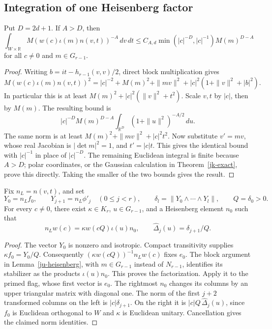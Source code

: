 \subsection{Integration of one Heisenberg factor}

\begin{lemma}\label{jm-e-int}
Put \(D=2d+1\).  If \(A>D\), then
\begin{equation}\label{jm-e-bound}
 \int_{W\times\mathbb R}
        M(w(c)\iota(m)n(v,t))^{-A}\,dv\,dt
 \leq C_{A,d}\min(|c|^{-D},|c|^{-1})M(m)^{D-A}
\end{equation}
for all \(c\ne0\) and \(m\in G_{r-1}\).
\end{lemma}

\begin{proof}
Writing \(b=it-h_{r-1}(v,v)/2\), direct block multiplication gives
\[
 M(w(c)\iota(m)n(v,t))^2
 =|c|^{-2}+M(m)^2+\|mv\|^2
                       +|c|^2(1+\|v\|^2+|b|^2).
\]
In particular this is at least
\(M(m)^2+|c|^2(\|v\|^2+t^2)\).
Scale \(v,t\) by \(|c|\), then by \(M(m)\).
The resulting bound is
\[
 |c|^{-D}M(m)^{D-A}
                    \int_{\mathbb R^D}(1+\|u\|^2)^{-A/2}\,du .
\]
The same norm is at least
\(M(m)^2+\|mv\|^2+|c|^2t^2\).
Now substitute \(v'=mv\), whose real Jacobian is
\(|\det m|^2=1\), and \(t'=|c|t\).
This gives the identical bound with \(|c|^{-1}\) in place
of \(|c|^{-D}\).
The remaining Euclidean integral is finite because \(A>D\);
polar coordinates, or the Gaussian calculation in
Theorem~\ref{jk-exact}, prove this directly.
Taking the smaller of the two bounds gives the result.
\end{proof}

\begin{lemma}\label{jm-left-factor}
Fix \(n_L=n(v,t)\), and set
\[
 Y_0=n_Lf_0,\qquad Y_{j+1}=n_L\phi'_j\quad(0\leq j<r),
 \qquad \delta_l=\|Y_0\wedge\cdots\wedge Y_l\|,
 \qquad Q=\delta_0>0.
\]
For every \(c\ne0\), there exist
\(\kappa\in K_r\), \(u\in G_{r-1}\), and a Heisenberg
element \(n_0\) such that
\begin{equation}\label{jm-left-decomposition}
 n_Lw(c)=\kappa w(cQ)\iota(u)n_0,\qquad
               \widehat\Delta_j(u)=\delta_{j+1}/Q.
\end{equation}
\end{lemma}

\begin{proof}
The vector \(Y_0\) is nonzero and isotropic.
Compact transitivity supplies \(\kappa f_0=Y_0/Q\).
Consequently
\((\kappa w(cQ))^{-1}n_Lw(c)\) fixes \(e_0\).
The block argument in Lemma~\ref{ju-heisenberg}, with
\(m\in G_{r-1}\) instead of \(N_{r-1}\), identifies its
stabilizer as the products \(\iota(u)n_0\).
This proves the factorization.
Apply it to the primed flag, whose first vector is \(e_0\).
The rightmost \(n_0\) changes its columns by an upper triangular
matrix with diagonal one.
The norm of the first \(j+2\) transformed columns on the left
is \(|c|\delta_{j+1}\).
On the right it is
\(|c|Q\,\widehat\Delta_j(u)\), since \(f_0\) is Euclidean
orthogonal to \(W\) and \(\kappa\) is Euclidean unitary.
Cancellation gives the claimed norm identities.
\end{proof}

